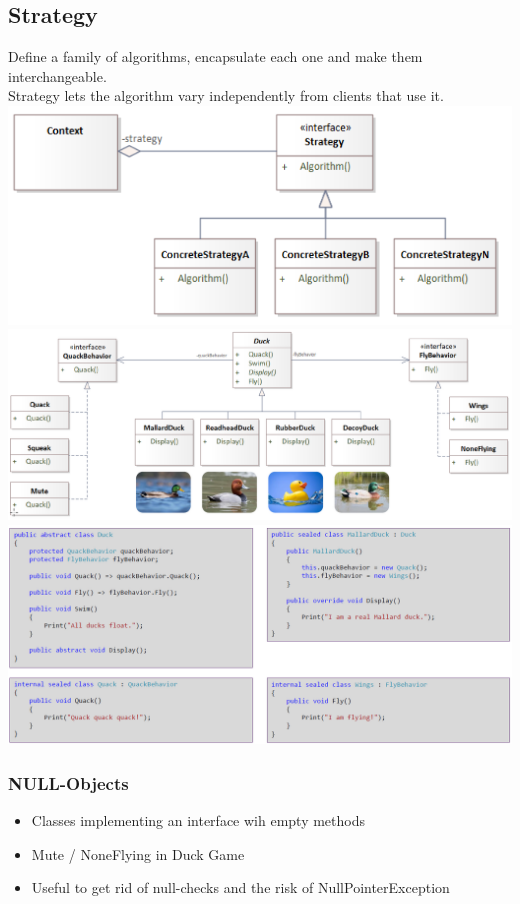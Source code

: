 \subsection{Strategy}
Define a family of algorithms, encapsulate each one and make them interchangeable.\\
Strategy lets the algorithm vary independently from clients that use it.\\
\includegraphics[width=0.85\linewidth]{../img/strategy_pattern.png}
\includegraphics[width=\linewidth]{../img/strategy_pattern_duck_pond.png}
\includegraphics[width=\linewidth]{../img/strategy_pattern_code.png}

\subsubsection{NULL-Objects}
\begin{itemize}
    \item Classes implementing an interface wih empty methods
    \item Mute / NoneFlying in Duck Game
    \item Useful to get rid of null-checks and the risk of NullPointerException
\end{itemize}

